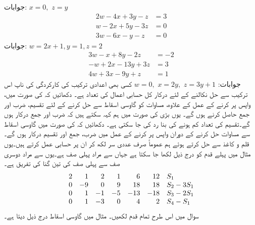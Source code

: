 جوابات:\quad
$x=0,\,\,z=y$
\quad
\begin{align*}
2w-4x+3y-z&=3\\
w-2x+5y-3z&=0\\
3w-6x-y-z&=0
\end{align*}
جوابات:\quad
$w=2x+1,y=1,z=2$
\quad
\begin{align*}
3w-x+8y-2z&=-2\\
-w+2x-13y+3z&=3\\
4w+3x-9y+z&=1
\end{align*}
جوابات:\quad
$w=0,\,\, x=2y,\,\,z=3y+1$
\quad {} کسی بھی اعدادی ترکیب کی کارکردگی کی ناپ اس ترکیب سے حل نکالنے کے لئے درکار  کل حسابی اعمال کی تعداد ہے۔ دکھائیں کہ  کی صورت میں، واپس پر کرنے کے عمل کے علاوہ، مساوات  کو گاوسی اسقاط سے حل کرنے کے لئے  تقسیم،  ضرب اور  جمع حاصل کرنے ہوں گے۔ یوں بڑی  کی صورت میں ہم کہہ سکتے ہیں کہ    ضرب اور جمع  درکار ہوں گے۔تقسیم کی تعداد کم ہونے کی بنا رد کی جا سکتی ہے۔
\quad
دکھائیں کہ  کی صورت میں گاوسی اسقاط سے مساوات  حل کرنے کے دوران واپس پر کرنے کے عمل میں   ضرب،  جمع اور  تقسیم درکار ہوں گے۔
\quad
قلم و کاغذ سے حل کرتے ہوئے ہم عموماً صرف عددی سر لکھ کر ان پر حسابی عمل کرتے ہیں۔یوں مثال  میں پہلے قدم کو درج ذیل لکھا جا سکتا ہے جہاں  سے مراد پہلی صف ہے۔یوں  سے مراد دوسری صف سے پہلی صف کی تین گنا کی تفریق ہے۔
\begin{align*}
\centering
\begin{array}{rrrrrrl}
2&1&2&1&6&12& S_1\\
0&-9&0&9&18&18&S_2-3S_1\\
0&1&-1&-5&-13&-18&S_3-2S_1\\
0&1&-3&0&4&2&S_4-S_1
\end{array}
\end{align*} 
سوال  میں اس طرح تمام قدم لکھیں۔
\quad {} 
مثال  میں گاوسی اسقاط درج ذیل دیتا ہے۔
